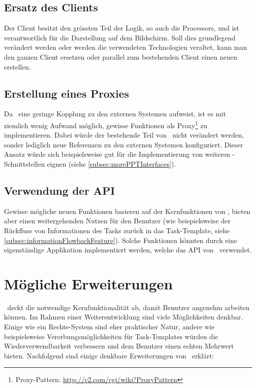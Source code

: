 		\subsection{Ersatz des Clients}
			Der Client besitzt den grössten Teil der Logik, so auch die Processors,
			und ist verantwortlich für die Darstellung auf dem Bildschirm.
			Soll dies grundlegend verändert werden oder werden die verwendeten Technologien veraltet,
			kann man den ganzen Client ersetzen oder parallel zum bestehenden Client einen neuen erstellen.

		\subsection{Erstellung eines Proxies}
			Da \eeppi\ eine geringe Kopplung zu den externen Systemen aufweist,
			 ist es mit ziemlich wenig Aufwand möglich,
			gewisse Funktionen als Proxy\footnote{Proxy-Pattern: \url{http://c2.com/cgi/wiki?ProxyPattern}} zu implementieren.
			Dabei würde der bestehende Teil von \eeppi\ nicht verändert werden,
			sonder lediglich neue Referenzen zu den externen Systemen konfiguriert.
			Dieser Ansatz würde sich beispielsweise gut für die Implementierung von weiteren \ppt-Schnittstellen eignen (siehe \ref{subsec:morePPTInterfaces}).
			
		\subsection{Verwendung der API}
			Gewisse mögliche neuen Funktionen basieren auf der Kernfunktionen von \eeppi,
			bieten aber einen weitergehenden Nutzen für den Benutzer
			(wie beispielsweise der Rückfluss von Informationen des Tasks zurück in das Task-Template, siehe \ref{subsec:informationFlowbackFeature}).
			Solche Funktionen könnten durch eine eigenständige Applikation implementiert werden,
			welche das API von \eeppi\ verwendet.


	\section{Mögliche Erweiterungen}
		\eeppi\ deckt die notwendige Kernfunktionalität ab, damit Benutzer angenehm arbeiten können.
		Im Rahmen einer Weiterentwicklung sind viele Möglichkeiten denkbar. 
		Einige wie ein Rechte-System sind eher praktischer Natur, 
		andere wie beispielsweise Vererbungsmöglichkeiten für Task-Templates würden die Wiederverwendbarkeit verbessern und dem Benutzer einen echten Mehrwert bieten.
		Nachfolgend sind einige denkbare Erweiterungen von \eeppi\ erklärt:
		
